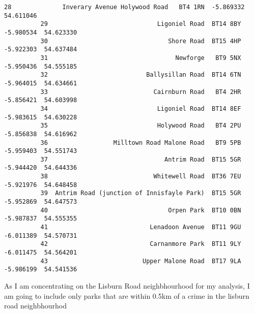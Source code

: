 \documentclass[11pt]{article}
\begin{document}
\begin{Verbatim}[commandchars=\\\{\}]
          28              Inverary Avenue Holywood Road   BT4 1RN  -5.869332  54.611046  
          29                              Ligoniel Road  BT14 8BY  -5.980534  54.623330  
          30                                 Shore Road  BT15 4HP  -5.922303  54.637484  
          31                                   Newforge   BT9 5NX  -5.950436  54.555185  
          32                           Ballysillan Road  BT14 6TN  -5.964015  54.634661  
          33                             Cairnburn Road   BT4 2HR  -5.856421  54.603998  
          34                              Ligoniel Road  BT14 8EF  -5.983615  54.630228  
          35                              Holywood Road   BT4 2PU  -5.856838  54.616962  
          36                  Milltown Road Malone Road   BT9 5PB  -5.959403  54.551743  
          37                                Antrim Road  BT15 5GR  -5.944420  54.644336  
          38                             Whitewell Road  BT36 7EU  -5.921976  54.648458  
          39  Antrim Road (junction of Innisfayle Park)  BT15 5GR  -5.952869  54.647573  
          40                                 Orpen Park  BT10 0BN  -5.987837  54.555355  
          41                            Lenadoon Avenue  BT11 9GU  -6.011389  54.570731  
          42                            Carnanmore Park  BT11 9LY  -6.011475  54.564201  
          43                          Upper Malone Road  BT17 9LA  -5.986199  54.541536  
\end{Verbatim}
            
     As I am concentrating on the Lisburn Road neighbhourhood for my
analysis, I am going to include only parks that are within 0.5km of a
crime in the lisburn road neighbhourhod 
\end{document}
